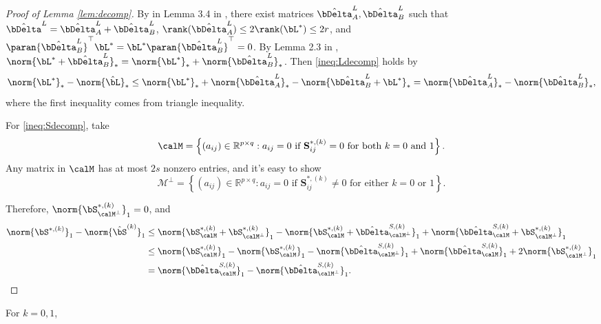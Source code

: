     \begin{proof}[Proof of Lemma \ref{lem:decomp}]
    	By in Lemma 3.4 in \cite{recht2010guaranteed}, there exist matrices $\hat\bDelta^{L}_A, \hat\bDelta^{L}_B$ such that
    	$\hat\bDelta^{L}=\hat\bDelta^{L}_A+ \hat\bDelta^{L}_B$, $\rank(\hat\bDelta^{L}_A) \leq 2 \rank(\bL^*) \leq 2r$, and $\paran{\hat\bDelta^{L}_B}^{\top} \bL^* = \bL^* \paran{\hat\bDelta^{L}_B}^{\top} =0$. By Lemma 2.3 in \cite{recht2010guaranteed}, $\norm{\bL^*+\hat\bDelta^{L}_B}_*=\norm{\bL^*}_*+\norm{\hat\bDelta^{L}_B}_*$. Then \eqref{ineq:Ldecomp} holds by
    	$$	\norm{\bL^*}_* - \norm{\hat\bL}_* \leq 	\norm{\bL^*}_* +	\norm{\hat\bDelta^{L}_A}_* -	\norm{\hat\bDelta^{L}_B+\bL^*}_* = \norm{\hat\bDelta^{L}_A}_* - \norm{\hat\bDelta^{L}_B}_*,$$
      where the first inequality comes from triangle inequality. 
      
      For \eqref{ineq:Sdecomp}, take 
      $$\calM = \left\{ (a_{ij}) \in \mathbb{R}^{p \times q} : a_{ij} = 0 \text{ if } \mathbf{S}^{*, (k)}_{ij} = 0 \text{ for both } k = 0 \text{ and } 1 \right\}.$$
     Any matrix in $\calM$ has at most $2s$ nonzero entries, and it's easy to show 
       $$\mathcal{M}^{\perp} = \left\{ (a_{ij}) \in \mathbb{R}^{p \times q} : a_{ij} = 0 \text{ if } \mathbf{S}^{*, (k)}_{ij} \neq 0 \text{ for either } k = 0 \text{ or } 1 \right\}.$$
       
       Therefore,  $\norm{\bS^{*, (k)}_{\calM^{\perp}}}_1=0$, and
       \begin{align*}
       	\norm{\bS^{*, (k)}}_1 - \norm{\hat\bS^{(k)}}_1 &\leq \norm{\bS_\calM^{*, (k)}+\bS_{\calM^\perp}^{*, (k)}}_1 - \norm{\bS^{*, (k)}_\calM + \hat\bDelta^{S,(k)}_{\calM^{\perp}}}_1 + \norm{\hat\bDelta^{S,(k)}_{\calM} + \bS^{*, (k)}_{\calM^{\perp}}}_1\\
       	&\leq \norm{\bS_\calM^{*, (k)}}_1 - \norm{\bS^{*, (k)}_\calM}_1 - \norm{\hat\bDelta^{S,(k)}_{\calM^{\perp}}}_1 + \norm{\hat\bDelta^{S,(k)}_{\calM}}_1 + 2\norm{\bS_{\calM^\perp}^{*, (k)}}_1\\
       	&= \norm{\hat\bDelta^{S,(k)}_{\calM}}_1 - \norm{\hat\bDelta^{S,(k)}_{\calM^{\perp}}}_1.
       \end{align*}
       	\end{proof}
       For $k=0,1$,
